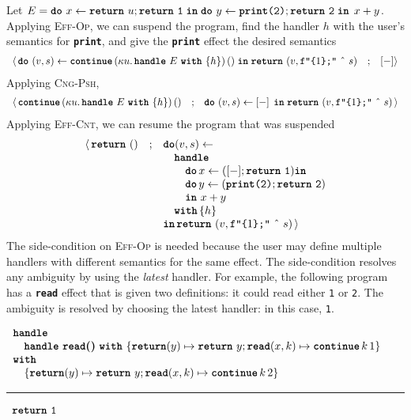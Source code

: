 Let $E = \texttt{\textbf{do}} \,\, {x} \leftarrow {\texttt{\textbf{return}} \,\, {u};\texttt{\textbf{return}} \,\, {\texttt{1}}} \; \textbf{\texttt{in}} \; {{\texttt{\textbf{do}} \,\, {y} \leftarrow {\texttt{\textbf{print}(2)};\texttt{\textbf{return}} \,\, {\texttt{2}}} \; \textbf{\texttt{in}} \; {\, x + y}}}$. Applying \textsc{Eff-Op}, we can suspend the program, find the handler $h$ with the user's semantics for \textbf{\texttt{print}}, and give the \textbf{\texttt{print}} effect the desired semantics
{  \arraycolsep=3pt
\small
\[\begin{array}{rcl}
  \langle \, \texttt{\textbf{do}} \,\, {(v, s)} \leftarrow {\textbf{\texttt{continue}} \, {(\kappa{} u. \, \textbf{\texttt{handle}} \,\, {E} \,\, \textbf{\texttt{with}} \,\, \{{h}\})} \, {()}} \; \textbf{\texttt{in}} \; {\texttt{\textbf{return}} \,\, {(v, \texttt{f"\{$1$\};"} \text{ \^\ } s)}} &;& [-] \rangle
\end{array}
  \]
}
Applying \textsc{Cng-Psh},
{  \arraycolsep=3pt
\small
\[\begin{array}{rcl}
  \langle \, \textbf{\texttt{continue}} \, {(\kappa{} u. \, \textbf{\texttt{handle}} \,\, {E} \,\, \textbf{\texttt{with}} \,\, \{{h}\})} \, {()} &;& \texttt{\textbf{do}} \,\, {(v, s)} \leftarrow {[-]\,} \; \textbf{\texttt{in}} \; {\texttt{\textbf{return}} \,\, {(v, \texttt{f"\{$1$\};"} \text{ \^\ } s)}}\, \rangle
\end{array}
  \]
}
Applying \textsc{Eff-Cnt}, we can resume the program that was suspended
{  \arraycolsep=3pt
\small
\[\begin{array}{rcl}
  \langle \, \texttt{\textbf{return}} \,\, {()} &;& \textbf{\texttt{do}} {(v, s)} \leftarrow \\
  && \quad \textbf{\texttt{handle}} \\
  && \quad \quad \textbf{\texttt{do}} \, x \leftarrow ([-];\texttt{\textbf{return}} \,\, {\texttt{1}}) \textbf{\texttt{in}}\\
  && \quad \quad \textbf{\texttt{do}} \, y \leftarrow (\texttt{\textbf{print}(2)};\texttt{\textbf{return}} \,\, {\texttt{2}})\\
  && \quad\quad \textbf{\texttt{in}} \, {\, x + y}\\
  && \quad \textbf{\texttt{with}} \, \{ h \}\\
  && \textbf{\texttt{in}} \, \texttt{\textbf{return}} \,\, {(v, \texttt{f"\{$1$\};"} \text{ \^\ } s)}  \, \rangle
\end{array}
  \]
}
The side-condition on \textsc{Eff-Op} is needed because the user may define multiple handlers with different semantics for the same effect. The side-condition resolves any ambiguity by using the \textit{latest} handler. For example, the following program has a \textbf{\texttt{read}} effect that is given two definitions: it could read either \texttt{1} or \texttt{2}. The ambiguity is resolved by choosing the latest handler: in this case, \texttt{1}.
\begin{eff}
$\begin{array}{l}
  \textbf{\texttt{handle}} \\
  \quad \textbf{\texttt{handle}} \,\, {\textbf{\texttt{read}()}} \,\, \textbf{\texttt{with}} \,\, \{{\textbf{\texttt{return}}(y) \mapsto \texttt{\textbf{return}} \,\, {y}; \textbf{\texttt{read}}(x, k) \mapsto {\textbf{\texttt{continue}} \, {k} \, {1}}}\} \\
  \textbf{\texttt{with}} \\ 
  \quad \{ \textbf{\texttt{return}}(y) \mapsto \texttt{\textbf{return}} \,\, {y}; \textbf{\texttt{read}}(x, k) \mapsto {\textbf{\texttt{continue}} \, {k} \, {2}} \}
\end{array}$ 

\vspace{2mm} 
\textcolor{effComment}{\hrule height 0.2mm \relax}
\vspace{2mm} 

\textcolor{effComment}{$\begin{array}{l}\texttt{\textbf{return}} \,\, {\texttt{1}}\end{array}$}
\end{eff}


